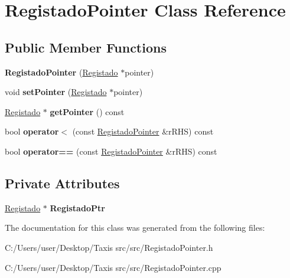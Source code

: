 \hypertarget{class_registado_pointer}{}\section{Registado\+Pointer Class Reference}
\label{class_registado_pointer}
\subsection*{Public Member Functions}
\begin{DoxyCompactItemize}
\item 
\mbox{\label{class_registado_pointer_aa8105ccc69c86a3518c13083b7ef2ffc}} 
{\bfseries Registado\+Pointer} (\hyperlink{class_registado}{Registado} $\ast$pointer)
\item 
\mbox{\label{class_registado_pointer_a17de381370f342f8f41f8ac04b756468}} 
void {\bfseries set\+Pointer} (\hyperlink{class_registado}{Registado} $\ast$pointer)
\item 
\mbox{\label{class_registado_pointer_ad055d2e36e8513da9e7563bb173b2f54}} 
\hyperlink{class_registado}{Registado} $\ast$ {\bfseries get\+Pointer} () const
\item 
\mbox{\label{class_registado_pointer_a88f54402e8174efc9f1ca634aa408c3a}} 
bool {\bfseries operator$<$} (const \hyperlink{class_registado_pointer}{Registado\+Pointer} \&r\+R\+HS) const
\item 
\mbox{\label{class_registado_pointer_a1606168effa9fc2ad4357bcd0675ff96}} 
bool {\bfseries operator==} (const \hyperlink{class_registado_pointer}{Registado\+Pointer} \&r\+R\+HS) const
\end{DoxyCompactItemize}
\subsection*{Private Attributes}
\begin{DoxyCompactItemize}
\item 
\mbox{\label{class_registado_pointer_a866eeeaa5732ff5f8b79599d339748d5}} 
\hyperlink{class_registado}{Registado} $\ast$ {\bfseries Registado\+Ptr}
\end{DoxyCompactItemize}


The documentation for this class was generated from the following files\+:\begin{DoxyCompactItemize}
\item 
C\+:/\+Users/user/\+Desktop/\+Taxis src/src/Registado\+Pointer.\+h\item 
C\+:/\+Users/user/\+Desktop/\+Taxis src/src/Registado\+Pointer.\+cpp\end{DoxyCompactItemize}
